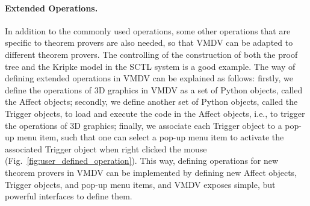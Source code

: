\documentclass[runningheads]{llncs}
\newcommand\tool[1]{\textsf{#1}}
\newcommand\vmdv{\tool{VMDV}}
\begin{document}
\paragraph{\bf Extended Operations.}
In addition to the commonly used operations, some other operations that are specific to theorem provers are also needed, so that \vmdv{} can be adapted to different theorem provers. The controlling of the construction of both the proof tree and the Kripke model in the \textsf{SCTL} system is a good example. 
The way of defining extended operations in \vmdv{} can be explained as follows: firstly, we define the operations of 3D graphics in \tool{VMDV} as a set of \tool{Python} objects, called the \textsf{Affect} objects; secondly, we define another set of \tool{Python} objects, called the \textsf{Trigger} objects, to load and execute the code in the \textsf{Affect} objects, i.e., to trigger the operations of 3D graphics; finally, we associate each \textsf{Trigger} object to a pop-up menu item, such that one can select a pop-up menu item to activate the associated \textsf{Trigger} object when right clicked the mouse (Fig.~\ref{fig:user_defined_operation}).
This way, defining operations for new theorem provers in \vmdv{} can be implemented by defining new \textsf{Affect} objects, \textsf{Trigger} objects, and pop-up menu items, and \vmdv{} exposes simple, but powerful interfaces to define them.


 

 
\end{document}
